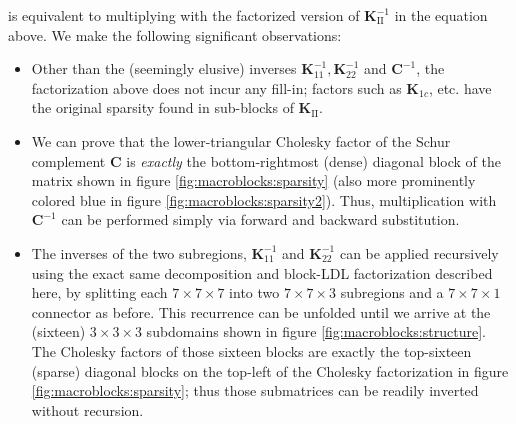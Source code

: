 is equivalent to multiplying with the factorized version of
$\mathbf{K}_{\textrm{II}}^{-1}$ in the equation above. We make the
following significant observations:
\begin{itemize}
\item Other than the (seemingly elusive) inverses
  $\mathbf{K}_{11}^{-1},\mathbf{K}_{22}^{-1}$ and $\mathbf{C}^{-1}$,
  the factorization above does not incur any fill-in; factors such as
  $\mathbf{K}_{1c}$, etc. have the original sparsity found in
  sub-blocks of $\mathbf{K}_{\textrm{II}}$.
\item We can prove that the lower-triangular Cholesky factor of the
  Schur complement $\mathbf{C}$ is \emph{exactly} the bottom-rightmost
  (dense) diagonal block of the matrix shown in figure
  \ref{fig:macroblocks:sparsity} (also more prominently colored blue in figure
  \ref{fig:macroblocks:sparsity2}). Thus, multiplication with $\mathbf{C}^{-1}$
  can be performed simply via forward and backward substitution.
\item The inverses of the two subregions, $\mathbf{K}_{11}^{-1}$ and
  $\mathbf{K}_{22}^{-1}$ can be applied recursively using the exact
  same decomposition and block-LDL factorization described here, by
  splitting each $7\times 7\times 7$ into two $7\times 7\times 3$
  subregions and a $7\times 7\times 1$ connector as before. This
  recurrence can be unfolded until we arrive at the (sixteen)
  $3\times 3\times 3$ subdomains shown in figure
  \ref{fig:macroblocks:structure}. The Cholesky factors of those sixteen blocks
  are exactly the top-sixteen (sparse) diagonal blocks on the top-left
  of the Cholesky factorization in figure \ref{fig:macroblocks:sparsity}; thus
  those submatrices can be readily inverted without recursion.
\end{itemize}

